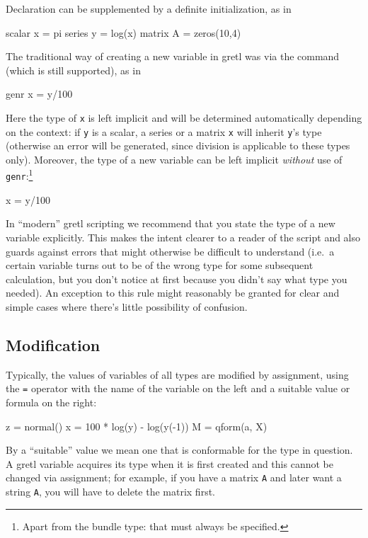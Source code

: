 Declaration can be supplemented by a definite initialization, as in

\begin{code}
scalar x = pi
series y = log(x)
matrix A = zeros(10,4)
\end{code}

The traditional way of creating a new variable in gretl was via
the  command (which is still supported), as in

\begin{code}
genr x = y/100
\end{code}

Here the type of \texttt{x} is left implicit and will be determined
automatically depending on the context: if \texttt{y} is a scalar, a
series or a matrix \texttt{x} will inherit \texttt{y}'s type
(otherwise an error will be generated, since division is applicable to
these types only). Moreover, the type of a new variable can be left
implicit \textit{without} use of \texttt{genr}:\footnote{Apart from
  the bundle type: that must always be specified.}

\begin{code}
x = y/100
\end{code}

In ``modern'' gretl scripting we recommend that you state the
type of a new variable explicitly. This makes the intent clearer to a
reader of the script and also guards against errors that might
otherwise be difficult to understand (i.e.\ a certain variable turns
out to be of the wrong type for some subsequent calculation, but you
don't notice at first because you didn't say what type you needed). An
exception to this rule might reasonably be granted for clear and
simple cases where there's little possibility of confusion.

\subsection{Modification}

Typically, the values of variables of all types are modified
by assignment, using the \texttt{=} operator with the name of the
variable on the left and a suitable value or formula on the right:

\begin{code}
z = normal()
x = 100 * log(y) - log(y(-1))
M = qform(a, X)
\end{code}

By a ``suitable'' value we mean one that is conformable for the type
in question. A gretl variable acquires its type when it is first
created and this cannot be changed via assignment; for example, if you
have a matrix \texttt{A} and later want a string \texttt{A}, you will
have to delete the matrix first.

